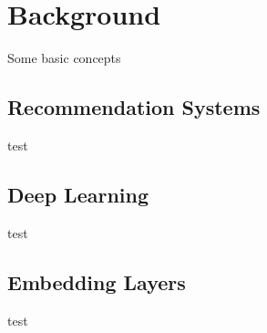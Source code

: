 \section{Background}
Some basic concepts
\subsection{Recommendation Systems}
test
\subsection{Deep Learning}
test
\subsection{Embedding Layers}
test